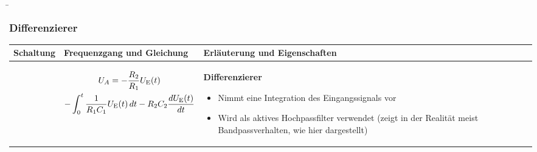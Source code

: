 
\begin{frame}
    \b{
    \frametitle{Differenzierer}
    \centering
    \begin{table}[ht]
    \label{tab:Differenzierer}
    \begin{tabular}{|m{}|m{}|m{}|}
    \hline
    Schaltung & Frequenzgang und Gleichung & Erläuterung und Eigenschaften\\ %
    \hline
    \vspace{0.5cm}
    \centering
    
    &
    \begin{center}
    
    \begin{multline*}
        U_A = - \frac{R_2}{R_1} U_{\textnormal{E}}(t) \\
        - \int_0^t \frac{1}{R_1 C_1} U_{\textnormal{E}}(t) \, dt 
        - R_2 C_2\frac{dU_{\textnormal{E}}(t)}{dt}
    \end{multline*}
    \end{center} 
    & 
    \textbf{Differenzierer}\newline
    \begin{itemize}
        \item Nimmt eine Integration des Eingangssignals vor
        \item Wird als aktives Hochpassfilter verwendet (zeigt in der Realität meist Bandpassverhalten, wie hier dargestellt)
    \end{itemize} \\
    \hline
    \end{tabular}
    \end{table}
    }
\end{frame}

